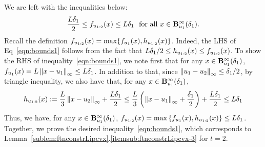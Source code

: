 We are left with the inequalities below:
\begin{equation}
\label{eqn:bounds1}
\frac{L\delta_1}{2} \leq f_{u_{1:{2}}}(x)  \leq L\delta_1~~\text{for all $x\in \mathbf{B}^\infty_{u_{1}}({\delta_{1}})$}.
\end{equation}
Recall the definition $f_{u_{1:{2}}}(x) = \max\{f_{u_1}(x), h_{u_{1:{2}}}(x)\}$.
Indeed, the LHS of Eq~\eqref{eqn:bounds1} follows from the fact that $L\delta_1/2 \leq h_{u_{1:{2}}}(x) \leq f_{u_{1:{2}}}(x)$.
To show the RHS of inequality~\eqref{eqn:bounds1}, we note first that
for any $x\in \mathbf{B}^\infty_{u_{1}}({\delta_{1}})$, $f_{u_1}(x) = L \left\|{x-u_1}\right\|_\infty \leq L\delta_1$. 
In addition to that, since $\left\|{u_1 - u_2}\right\|_\infty \leq \delta_1/2$, by 
triangle inequality, we also have that, for any $x\in \mathbf{B}^\infty_{u_{1}}({\delta_{1}})$, 
\begin{equation*}
h_{u_{1:{2}}}(x) := \frac{L}{3} \left\|{x-u_2}\right\|_\infty + \frac{L \delta_1}{2} 
\leq \frac{L}{3} \left(\left\|{x-u_1}\right\|_\infty + \frac{\delta_1}{2}\right) 
+ \frac{L\delta_1}{2} \leq L\delta_1
\end{equation*}
Thus, we have, for any $x\in \mathbf{B}^\infty_{u_{1}}({\delta_{1}})$, 
$f_{u_{1:{2}}}(x) = \max\left\{f_{u_1}(x), h_{u_{1:{2}}}(x)\right\} \leq L\delta_1$. 
Together, we prove the desired inequality~\eqref{eqn:bounds1},
which corresponds to Lemma~\ref{sublem:ftnconstrLipcvx}.\ref{itemsub:ftnconstrLipcvx-3} for $t=2$.

